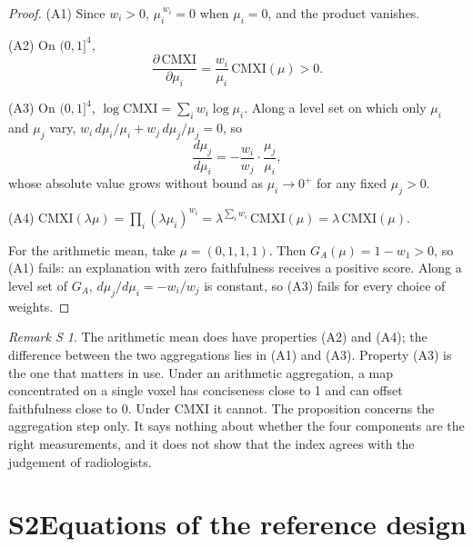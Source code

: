 \documentclass[10pt,a4paper]{article}
\theoremstyle{definition}\newtheorem{definition}{Definition S\!}
\theoremstyle{remark}\newtheorem{remark}{Remark S\!}
\begin{document}
\begin{proof}
(A1) Since $w_i>0$, $\mu_i^{\,w_i}=0$ when $\mu_i=0$, and the product vanishes.

(A2) On $(0,1]^4$,
\[
\frac{\partial\,\mathrm{CMXI}}{\partial\mu_i}=\frac{w_i}{\mu_i}\,\mathrm{CMXI}(\mu)>0 .
\]

(A3) On $(0,1]^4$, $\log\mathrm{CMXI}=\sum_i w_i\log\mu_i$. Along a level set on which only $\mu_i$ and $\mu_j$ vary, $w_i\,d\mu_i/\mu_i+w_j\,d\mu_j/\mu_j=0$, so
\[
\frac{d\mu_j}{d\mu_i}=-\frac{w_i}{w_j}\cdot\frac{\mu_j}{\mu_i},
\]
whose absolute value grows without bound as $\mu_i\to0^{+}$ for any fixed $\mu_j>0$.

(A4) $\mathrm{CMXI}(\lambda\mu)=\prod_i(\lambda\mu_i)^{w_i}=\lambda^{\sum_i w_i}\,\mathrm{CMXI}(\mu)=\lambda\,\mathrm{CMXI}(\mu)$.

For the arithmetic mean, take $\mu=(0,1,1,1)$. Then $G_A(\mu)=1-w_1>0$, so (A1) fails: an explanation with zero faithfulness receives a positive score. Along a level set of $G_A$, $d\mu_j/d\mu_i=-w_i/w_j$ is constant, so (A3) fails for every choice of weights.
\end{proof}

\begin{remark}
The arithmetic mean does have properties (A2) and (A4); the difference between the two aggregations lies in (A1) and (A3). Property (A3) is the one that matters in use. Under an arithmetic aggregation, a map concentrated on a single voxel has conciseness close to 1 and can offset faithfulness close to 0. Under CMXI it cannot. The proposition concerns the aggregation step only. It says nothing about whether the four components are the right measurements, and it does not show that the index agrees with the judgement of radiologists.
\end{remark}

\section*{S2\quad Equations of the reference design}
\end{document}
